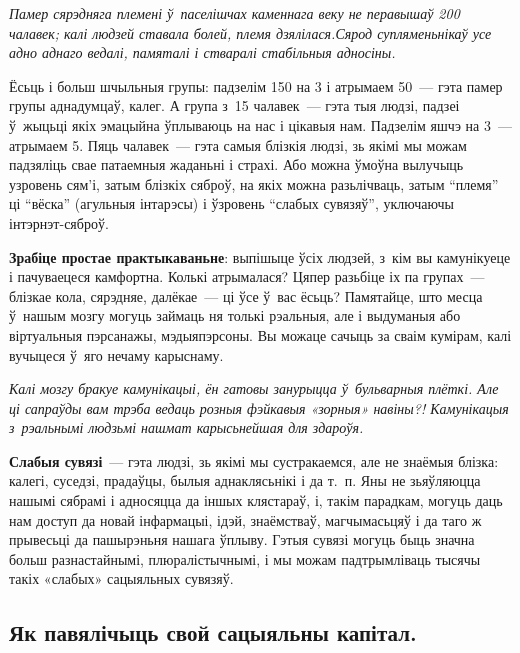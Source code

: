 \emph{Памер сярэдняга племені ў~паселішчах каменнага веку не перавышаў 200 чалавек; калі людзей ставала болей, племя дзялілася.Сярод супляменьнікаў усе адно аднаго ведалі, памяталі і стваралі стабільныя адносіны.}

Ёсьць і больш шчыльныя групы: падзелім 150 на 3 і атрымаем 50~--- гэта памер групы аднадумцаў, калег. А група з~15 чалавек~--- гэта тыя людзі, падзеі ў~жыцьці якіх эмацыйна ўплываюць на нас і цікавыя нам. Падзелім яшчэ на 3~--- атрымаем 5. Пяць чалавек~--- гэта самыя блізкія людзі, зь якімі мы можам падзяліць свае патаемныя жаданьні і страхі. Або можна ўмоўна вылучыць узровень сям'і, затым блізкіх сяброў, на якіх можна разьлічваць, затым ``племя'' ці ``вёска'' (агульныя інтарэсы) і ўзровень ``слабых сувязяў'', уключаючы інтэрнэт-сяброў.

\textbf{Зрабіце простае практыкаваньне}: выпішыце ўсіх людзей, з~кім вы камунікуеце і пачуваецеся камфортна. Колькі атрымалася? Цяпер разьбіце іх па групах~--- блізкае кола, сярэдняе, далёкае~--- ці ўсе ў~вас ёсьць? Памятайце, што месца ў~нашым мозгу могуць займаць ня толькі рэальныя, але і выдуманыя або віртуальныя пэрсанажы, мэдыяпэрсоны. Вы можаце сачыць за сваім кумірам, калі вучыцеся ў~яго нечаму карыснаму.

\emph{Калі мозгу бракуе камунікацыі, ён гатовы занурыцца ў~бульварныя плёткі. Але ці сапраўды вам трэба ведаць розныя фэйкавыя «зорныя» навіны?! Камунікацыя з~рэальнымі людзьмі нашмат карысьнейшая для здароўя.}


\textbf{Слабыя сувязі}~--- гэта людзі, зь якімі мы сустракаемся, але не знаёмыя блізка: калегі, суседзі, прадаўцы, былыя аднаклясьнікі і да т.~п. Яны не зьяўляюцца нашымі сябрамі і адносяцца да іншых клястараў, і, такім парадкам, могуць даць нам доступ да новай інфармацыі, ідэй, знаёмстваў, магчымасьцяў і да таго ж прывесьці да пашырэньня нашага ўплыву. Гэтыя сувязі могуць быць значна больш разнастайнымі, плюралістычнымі, і мы можам падтрымліваць тысячы такіх «слабых» сацыяльных сувязяў.

\subsection*{Як павялічыць свой сацыяльны капітал.}

